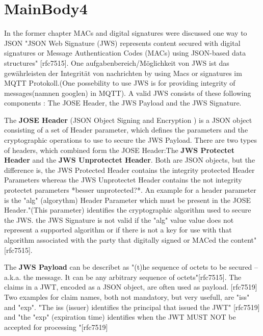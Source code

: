 \section{MainBody4}

In the former chapter MACs and digital signatures were discussed one way to 
JSON
"JSON Web Signature (JWS) represents content secured with digital signatures or Message Authentication Codes (MACs) using JSON-based  data structures" [rfc7515].
One aufgabenbereich/Möglichkeit  von JWS ist das gewährleisten der Integrität von nachrichten by using Macs or signatures im MQTT Protokoll.(One possebility to use JWS is for providing integrity of messages(namnen googlen) in MQTT).
A valid JWS consists of these following components : The JOSE Header, the JWS Payload and the JWS Signature.\newline

The \textbf{JOSE Header} (JSON Object Signing and Encryption ) is a JSON object consisting of a set of Header parameter, which defines the parameters and the cryptographic operations to use to secure the JWS Payload. There are two types of headers, which combined form the JOSE Header:\newline The \textbf{JWS Protectet Header} and the \textbf{JWS Unprotectet Header}.\newline
Both are JSON objects, but the difference is, the JWS Protected Header contains the integrity protected Header Parameters whereas the JWS Unprotectet Header contains the not integrity protectet parameters *besser unprotected?*.\newline
An example for a header parameter is the "alg" (algorythm) Header Parameter which must be present in the JOSE Header."(This parameter) identifies the cryptographic algorithm used to secure the JWS. the JWS Signature is not valid if the "alg" value value does not represent a supported algorithm or if there is not a key for use with that algorithm associated with the party that digitally signed or MACed the content" [rfc7515].\newline

The \textbf{JWS Payload} can be describet as "(t)he sequence of octets to be secured -- a.k.a. the message. It can be any arbitrary  sequence of octets"[rfc7515].\newline
The claims in a JWT, encoded as a JSON object, are often used as payload. [rfc7519]\newline
Two examples for claim names, both not mandatory, but very usefull, are "iss" and "exp". "The iss (issuer) identifies the principal that issued the JWT" [rfc7519] and "the "exp" (expiration time) identifies when the JWT MUST NOT be accepted for processing "[rfc7519] \newline

